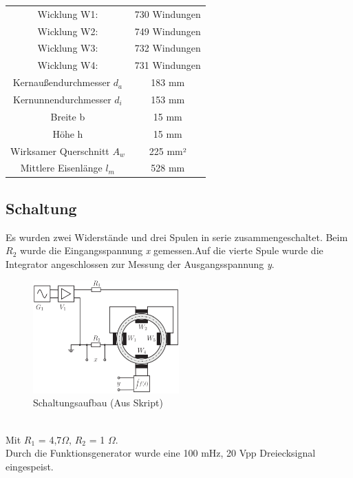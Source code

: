 \documentclass[a4paper,twoside,12pt,DIV=13,BCOR=5mm,numbers=noenddot,cleardoublepage=empty]{scrbook}
\begin{document}
    \begin{center}
        
    \begin{tabular}{cc}
    Wicklung W1: & 730 Windungen \\
    Wicklung W2: & 749 Windungen \\
    Wicklung W3: & 732 Windungen \\
    Wicklung W4: & 731 Windungen \\
    Kernaußendurchmesser $d_a$ & 183 mm \\
    Kernunnendurchmesser $d_i$ & 153 mm \\
    Breite b & 15 mm \\
    Höhe h & 15 mm \\
    Wirksamer Querschnitt $A_w$ & 225 mm² \\
    Mittlere Eisenlänge $l_m$ & 528 mm \\
    \end{tabular}
    \end{center}
    
    \subsection{Schaltung}

    Es wurden zwei Widerstände und drei Spulen in serie zusammengeschaltet. Beim \textit{$R_2$} wurde die Eingangsspannung \textit{x} gemessen.Auf die vierte Spule wurde die Integrator angeschlossen zur Messung der Ausgangsspannung \textit{y}.
    \begin{figure}[h] 
    \centering
    \includegraphics[width=0.5\textwidth]{pictures/HystereseSchaltung.png} %
    \caption{Schaltungsaufbau (Aus Skript)}
    \end{figure}\\
    Mit $R_1$ = 4,7$\Omega$, $R_2$ = 1 $\Omega$. \\
    Durch die Funktionsgenerator wurde eine 100 mHz, 20 Vpp Dreiecksignal eingespeist.
\end{document}
